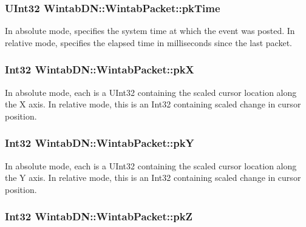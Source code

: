 \hypertarget{struct_wintab_d_n_1_1_wintab_packet_a4e655a9a5378d55d47a3e275e4e68093}{
\subsubsection[{pkTime}]{\setlength{\rightskip}{0pt plus 5cm}UInt32 {\bf WintabDN::WintabPacket::pkTime}}}
\label{struct_wintab_d_n_1_1_wintab_packet_a4e655a9a5378d55d47a3e275e4e68093}


In absolute mode, specifies the system time at which the event was posted. In relative mode, specifies the elapsed time in milliseconds since the last packet. 

\hypertarget{struct_wintab_d_n_1_1_wintab_packet_aa0986c51cb8c47d6eeaf1d0ec81335d0}{
\subsubsection[{pkX}]{\setlength{\rightskip}{0pt plus 5cm}Int32 {\bf WintabDN::WintabPacket::pkX}}}
\label{struct_wintab_d_n_1_1_wintab_packet_aa0986c51cb8c47d6eeaf1d0ec81335d0}


In absolute mode, each is a UInt32 containing the scaled cursor location along the X axis. In relative mode, this is an Int32 containing scaled change in cursor position. 

\hypertarget{struct_wintab_d_n_1_1_wintab_packet_ab3bd9cbd554397abd270d9c40fc1f34e}{
\subsubsection[{pkY}]{\setlength{\rightskip}{0pt plus 5cm}Int32 {\bf WintabDN::WintabPacket::pkY}}}
\label{struct_wintab_d_n_1_1_wintab_packet_ab3bd9cbd554397abd270d9c40fc1f34e}


In absolute mode, each is a UInt32 containing the scaled cursor location along the Y axis. In relative mode, this is an Int32 containing scaled change in cursor position. 

\hypertarget{struct_wintab_d_n_1_1_wintab_packet_ac5525a22d05a0a38e4522d9abbd91bb2}{
\subsubsection[{pkZ}]{\setlength{\rightskip}{0pt plus 5cm}Int32 {\bf WintabDN::WintabPacket::pkZ}}}
\label{struct_wintab_d_n_1_1_wintab_packet_ac5525a22d05a0a38e4522d9abbd91bb2}


